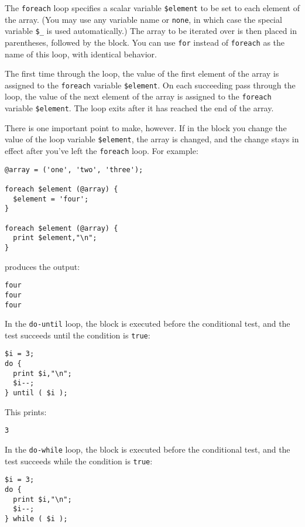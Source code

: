 The \verb|foreach| loop specifies a scalar variable \verb|$element| to be set to each element of the array. (You may use any variable name or \verb|none|, in which case the special variable \verb|$_| is used automatically.) The array to be iterated over is then placed in parentheses, followed by the block. You can use \verb|for| instead of \verb|foreach| as the name of this loop, with identical behavior.

The first time through the loop, the value of the first element of the array is assigned to the \verb|foreach| variable \verb|$element|. On each succeeding pass through the loop, the value of the next element of the array is assigned to the \verb|foreach| variable \verb|$element|. The loop exits after it has reached the end of the array.

There is one important point to make, however. If in the block you change the value of the loop variable \verb|$element|, the array is changed, and the change stays in effect after you've left the \verb|foreach| loop. For example:

\begin{lstlisting}
@array = ('one', 'two', 'three');

foreach $element (@array) {
  $element = 'four';
}

foreach $element (@array) {
  print $element,"\n";
}
\end{lstlisting}

produces the output:

\begin{lstlisting}
four
four
four
\end{lstlisting}

In the \verb|do-until| loop, the block is executed before the conditional test, and the test succeeds until the condition is \verb|true|:

\begin{lstlisting}
$i = 3;
do {
  print $i,"\n";
  $i--;
} until ( $i );
\end{lstlisting}

This prints:

\begin{lstlisting}
3
\end{lstlisting}

In the \verb|do-while| loop, the block is executed before the conditional test, and the test succeeds while the condition is \verb|true|:

\begin{lstlisting}
$i = 3;
do {
  print $i,"\n";
  $i--;
} while ( $i );
\end{lstlisting}

